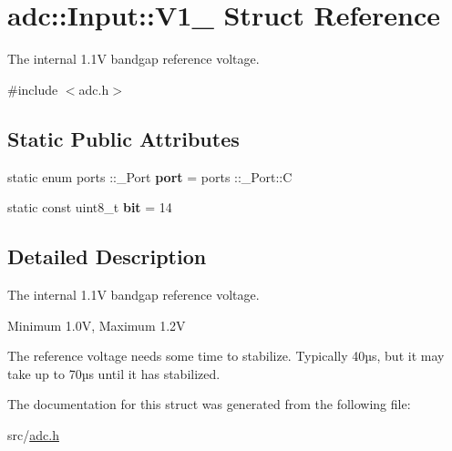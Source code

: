 \hypertarget{structadc_1_1Input_1_1V1__1}{}\section{adc\+:\+:Input\+:\+:V1\+\_ Struct Reference}
\label{structadc_1_1Input_1_1V1__1}


The internal 1.\+1V bandgap reference voltage.  




{\ttfamily \#include $<$adc.\+h$>$}

\subsection*{Static Public Attributes}
\begin{DoxyCompactItemize}
\item 
\hypertarget{structadc_1_1Input_1_1V1__1_a0f6e5910e843675ac0a56d2c5b4d9ef6}{}\label{structadc_1_1Input_1_1V1__1_a0f6e5910e843675ac0a56d2c5b4d9ef6} 
static enum ports \+::\+\_\+\+Port {\bfseries port} = ports \+::\+\_\+\+Port\+::C
\item 
\hypertarget{structadc_1_1Input_1_1V1__1_a810f3c569f78bd751aa399ace63d586d}{}\label{structadc_1_1Input_1_1V1__1_a810f3c569f78bd751aa399ace63d586d} 
static const uint8\+\_\+t {\bfseries bit} = 14
\end{DoxyCompactItemize}


\subsection{Detailed Description}
The internal 1.\+1V bandgap reference voltage. 

Minimum 1.\+0V, Maximum 1.\+2V

The reference voltage needs some time to stabilize. Typically 40µs, but it may take up to 70µs until it has stabilized. 

The documentation for this struct was generated from the following file\+:\begin{DoxyCompactItemize}
\item 
src/\hyperlink{adc_8h}{adc.\+h}\end{DoxyCompactItemize}
